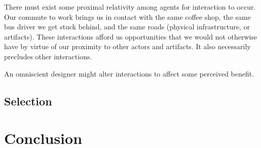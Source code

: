 \documentclass[jou,apacite]{apa6}
\begin{document}
There must exist some proximal relativity among agents for interaction to occur.  Our commute to work brings us in contact with the same coffee shop, the same bus driver we get stuck behind, and the same roads (physical infrastructure, or artifacts).  These interactions afford us opportunities that we would not otherwise have by virtue of our proximity to other actors and artifacts.  It also necessarily precludes other interactions.

An omniscient designer might alter interactions to affect some perceived benefit.

\subsection{Selection}

\section{Conclusion}


\end{document}
